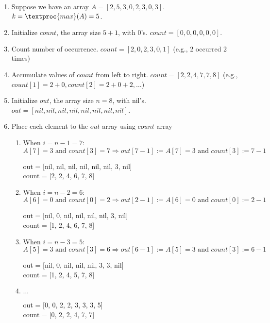 \begin{enumerate}
  \item Suppose we have an array $A = [ 2, 5, 3, 0, 2, 3, 0, 3 ]$. $k = \textproc{max}(A) = 5$.
  \item Initialize $count$, the array size $5 + 1$, with 0's. $count = [0, 0, 0, 0, 0, 0]$.
  \item Count number of occurrence. $count = [2, 0, 2, 3, 0, 1]$ (e.g., 2 occurred 2 times)
  \item Accumulate values of $count$ from left to right. $count = [2, 2, 4, 7, 7, 8]$ (e.g., $count[1] = 2 + 0, count[2] = 2 + 0 + 2, \ldots$)
  \item Initialize $out$, the array size $n = 8$, with nil's. $out = [nil, nil, nil, nil, nil, nil, nil, nil]$.
  \item Place each element to the $out$ array using $count$ array
    \begin{enumerate}
      \item When $i = n - 1 = 7$: $A[7] = 3 \text{ and } count[3] = 7 \Rightarrow out[7 - 1] := A[7] = 3 \text{ and } count[3] := 7 - 1$
        \begin{center}
          out = [nil, nil, nil, nil, nil, nil, 3, nil] \\
          count = [2, 2, 4, 6, 7, 8]
        \end{center}
      \item When $i = n - 2 = 6$: $A[6] = 0 \text{ and } count[0] = 2 \Rightarrow out[2 - 1] := A[6] = 0 \text{ and } count[0] := 2 - 1$
        \begin{center}
          out = [nil, 0, nil, nil, nil, nil, 3, nil] \\
          count = [1, 2, 4, 6, 7, 8]
        \end{center}
      \item When $i = n - 3 = 5$: $A[5] = 3 \text{ and } count[3] = 6 \Rightarrow out[6 - 1] := A[5] = 3 \text{ and } count[3] := 6 - 1$
        \begin{center}
          out = [nil, 0, nil, nil, nil, 3, 3, nil] \\
          count = [1, 2, 4, 5, 7, 8]
        \end{center}
      \item $\ldots$
        \begin{center}
          out = [0, 0, 2, 2, 3, 3, 3, 5] \\
          count = [0, 2, 2, 4, 7, 7]
        \end{center}
    \end{enumerate}
\end{enumerate}


